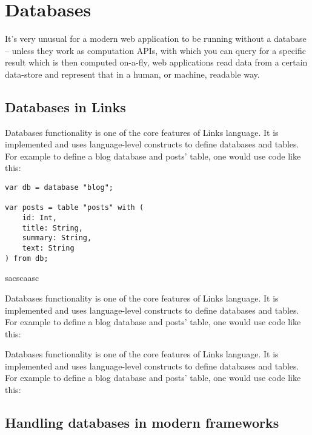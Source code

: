 
\chapter{Databases}

It's very unusual for a modern web application to be running without a database – unless they work as computation APIs, with which you can query for a specific result which is then computed on-a-fly, web applications read data from a certain data-store and represent that in a human, or machine, readable way.

\section{Databases in Links}

Databases functionality is one of the core features of Links language. It is implemented and uses language-level constructs to define databases and tables. For example to define a blog database and posts' table, one would use code like this:

\begin{codelisting}
\begin{verbatim}
var db = database "blog"; 

var posts = table "posts" with ( 
    id: Int, 
    title: String, 
    summary: String, 
    text: String 
) from db;
\end{verbatim}
\end{codelisting}

sacscaasc

Databases functionality is one of the core features of Links language. It is implemented and uses language-level constructs to define databases and tables. For example to define a blog database and posts' table, one would use code like this:

Databases functionality is one of the core features of Links language. It is implemented and uses language-level constructs to define databases and tables. For example to define a blog database and posts' table, one would use code like this:

\section{Handling databases in modern frameworks}


